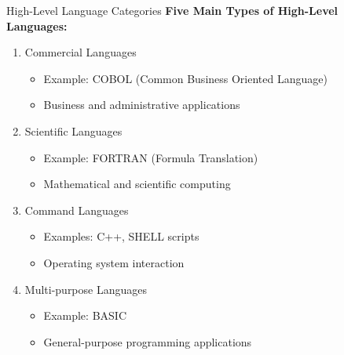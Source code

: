 \documentclass[aspectratio=169]{beamer}
\begin{document}
\begin{frame}{High-Level Language Categories}
    \textbf{Five Main Types of High-Level Languages:}
    
    \begin{enumerate}
        \item Commercial Languages
        \begin{itemize}
            \item Example: COBOL (Common Business Oriented Language)
            \item Business and administrative applications
        \end{itemize}
        
        \item Scientific Languages
        \begin{itemize}
            \item Example: FORTRAN (Formula Translation)
            \item Mathematical and scientific computing
        \end{itemize}
        
        \item Command Languages
        \begin{itemize}
            \item Examples: C++, SHELL scripts
            \item Operating system interaction
        \end{itemize}
        
        \item Multi-purpose Languages
        \begin{itemize}
            \item Example: BASIC
            \item General-purpose programming applications
        \end{itemize}
    \end{enumerate}
\end{frame}
\end{document}
